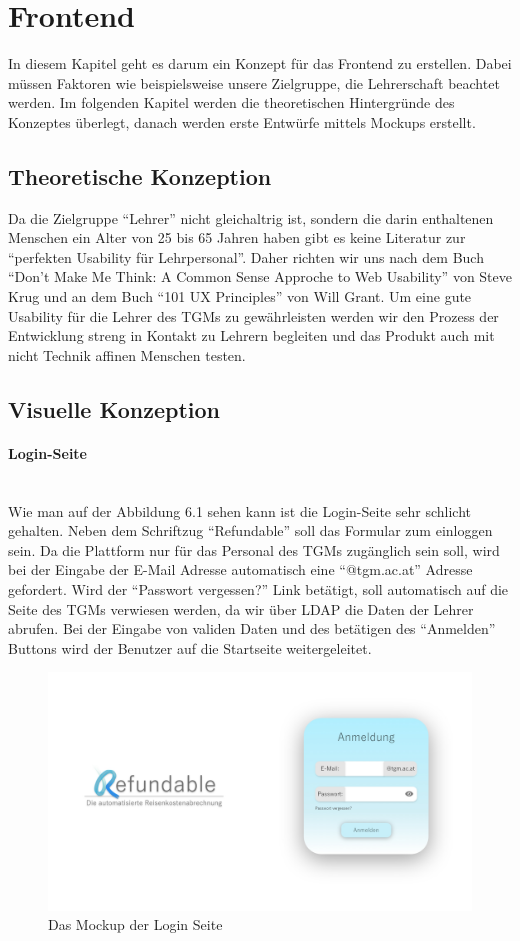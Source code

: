 \section{Frontend}
In diesem Kapitel geht es darum ein Konzept für das Frontend zu erstellen. Dabei müssen Faktoren wie beispielsweise unsere Zielgruppe, die Lehrerschaft beachtet werden. Im folgenden Kapitel werden die theoretischen Hintergründe des Konzeptes überlegt, danach werden erste Entwürfe mittels Mockups erstellt. 
\subsection{Theoretische Konzeption}
Da die Zielgruppe \enquote{Lehrer} nicht gleichaltrig ist, sondern die darin enthaltenen Menschen ein Alter von 25 bis 65 Jahren haben gibt es keine Literatur zur \enquote{perfekten Usability für Lehrpersonal}. Daher richten wir uns nach dem Buch \enquote{Don't Make Me Think: A Common Sense Approche to Web Usability} von Steve Krug und an dem Buch \enquote{101 UX Principles} von Will Grant. Um eine gute Usability für die Lehrer des TGMs zu gewährleisten werden wir den Prozess der Entwicklung streng in Kontakt zu Lehrern begleiten und das Produkt auch mit nicht Technik affinen Menschen testen.  
\subsection{Visuelle Konzeption}
\paragraph{Login-Seite}
~\\
Wie man auf der Abbildung 6.1 sehen kann ist die Login-Seite sehr schlicht gehalten. Neben dem Schriftzug \enquote{Refundable} soll das Formular zum einloggen sein. Da die Plattform nur für das Personal des TGMs zugänglich sein soll, wird bei der Eingabe der E-Mail Adresse automatisch eine \enquote{@tgm.ac.at} Adresse gefordert. Wird der \enquote{Passwort vergessen?} Link betätigt, soll automatisch auf die Seite des TGMs verwiesen werden, da wir über LDAP die Daten der Lehrer abrufen. Bei der Eingabe von validen Daten und des betätigen des \enquote{Anmelden} Buttons wird der Benutzer auf die Startseite weitergeleitet.
\begin{figure}[H]
	\centering
	\includegraphics[width=1\linewidth]{images/Mockup-Startseite}
	\caption[Mockup Login]{Das Mockup der Login Seite}
	\label{fig:mockupLogin}
\end{figure}
